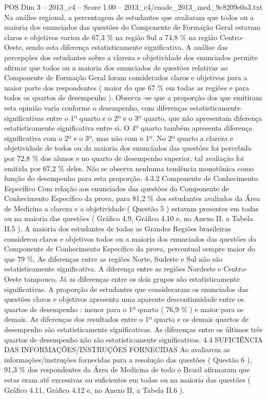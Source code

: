 \begin{textsample}{POS Dim 3 – 2013\_c4 – Score 1.00 – 2013\_c4/enade\_2013\_med\_9c8209e0a3.txt}
Na análise regional, a percentagem de estudantes que avaliaram que todos ou a maioria dos enunciados das questões do Componente de Formação Geral estavam claros e objetivos variou de 67,3 \% na região Sul a 74,8 \% na região Centro-Oeste, sendo esta diferença estatisticamente significativa.
A análise das percepções dos estudantes sobre a clareza e objetividade dos enunciados permite afirmar que todos ou a maioria dos enunciados de questões relativas ao Componente de Formação Geral foram considerados claros e objetivos para a maior parte dos respondentes ( maior do que 67 \% em todas as regiões e para todos os quartos de desempenho ).
Observa -se que a proporção dos que emitiram esta opinião varia conforme o desempenho, com diferenças estatisticamente significativas entre o 1º quarto e o 2º e o 3º quarto, que não apresentam diferença estatisticamente significativa entre si.
O 4º quarto também apresenta diferença significativa com o 2º e o 3º, mas não com o 1º.
No 2º quarto a clareza e objetividade de todos ou da maioria dos enunciados das questões foi percebida por 72,8 \% dos alunos e no quarto de desempenho superior, tal avaliação foi emitida por 67,2 \% deles.
Não se observa nenhuma tendência monotônica como função do desempenho para esta proporção. 4.3.2 Componente de Conhecimento Específico Com relação aos enunciados das questões do Componente de Conhecimento Específico da prova, para 81,2 \% dos estudantes avaliados da Área de Medicina a clareza e a objetividade ( Questão 5 ) estavam presentes em todas ou na maioria das questões ( Gráfico 4.9, Gráfico 4.10 e, no Anexo II, a Tabela II.5 ).
A maioria dos estudantes de todas as Grandes Regiões brasileiras considerou claros e objetivos todos ou a maioria dos enunciados das questões do Componente de Conhecimento Específico da prova, percentual sempre maior do que 79 \%.
As diferenças entre as regiões Norte, Sudeste e Sul não são estatisticamente significativa.
A diferença entre as regiões Nordeste e Centro-Oeste tampouco.
Já as diferenças entre os dois grupos são estatisticamente significativas.
A proporção de estudantes que consideraram os enunciados das questões claros e objetivos apresenta uma aparente descontinuidade entre os quartos de desempenho : menor para o 1º quarto ( 76,9 \% ) e maior para os demais.
As diferenças dos resultados entre o 1º quarto e os demais quartos de desempenho são estatisticamente significativas.
As diferenças entre os últimos três quartos de desempenho não são estatisticamente significativas. 4.4 SUFICIÊNCIA DAS INFORMAÇÕES/INSTRUÇÕES FORNECIDAS Ao avaliarem as informações/instruções fornecidas para a resolução das questões ( Questão 6 ), 91,3 \% dos respondentes da Área de Medicina de todo o Brasil afirmaram que estas eram até excessivas ou suficientes em todas ou na maioria das questões ( Gráfico 4.11, Gráfico 4.12 e, no Anexo II, a Tabela II.6 ).

\end{textsample}
